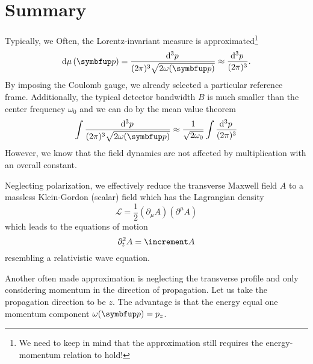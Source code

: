 \section*{Summary}

Typically, we 
Often, the Lorentz-invariant measure is approximated\footnote{We need to keep in mind that the approximation still requires the energy-momentum relation to hold!}
\begin{equation}
	\dd{\mu}(\vb{p})
	=
	\frac{\dd[3]{p}}{(2\pi)^3\sqrt{2\omega(\vb{p})}}
	\approx
	\frac{\dd[3]{p}}{(2\pi)^3}
	.
\end{equation}
By imposing the Coulomb gauge, we already selected a particular reference frame.
Additionally, the typical detector bandwidth $B$ is much smaller than the center frequency $\omega_0$ and we can do by the mean value theorem
\begin{equation}
	\int
	\frac{\dd[3]{p}}{(2\pi)^3\sqrt{2\omega(\vb{p})}}
	\approx
	\frac{1}{\sqrt{2\omega_0}}
	\int
	\frac{\dd[3]{p}}{(2\pi)^3}
\end{equation}
However, we know that the field dynamics are not affected by multiplication with an overall constant.

Neglecting polarization, we effectively reduce the transverse Maxwell field $A$ to a massless Klein-Gordon (scalar) field which has the Lagrangian density
\begin{equation}
	\mathcal{L}
	=
	\frac{1}{2}
	\left(
		\partial_\mu A
	\right)
	\left(
		\partial^\mu A
	\right)
\end{equation}
which leads to the equations of motion
\begin{equation}
	\partial_t^2 A
	=
	\laplace A
\end{equation}
resembling a relativistic wave equation.

Another often made approximation is neglecting the transverse profile and only considering momentum in the direction of propagation.
Let us take the propagation direction to be $z$.
The advantage is that the energy equal one momentum component $\omega(\vb{p})=p_z$.



